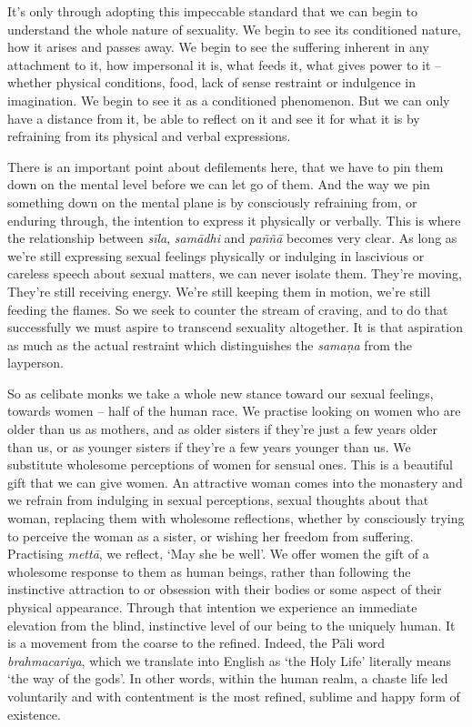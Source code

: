 It's only through adopting this impeccable standard that we can begin to
understand the whole nature of sexuality. We begin to see its
conditioned nature, how it arises and passes away. We begin to see the
suffering inherent in any attachment to it, how impersonal it is, what
feeds it, what gives power to it -- whether physical conditions, food, 
lack of sense restraint or indulgence in imagination. We begin to see it
as a conditioned phenomenon. But we can only have a distance from it, be
able to reflect on it and see it for what it is by refraining from its
physical and verbal expressions. 

There is an important point about defilements here, that we have to pin
them down on the mental level before we can let go of them. And the way
we pin something down on the mental plane is by consciously refraining
from, or enduring through, the intention to express it physically or
verbally. This is where the relationship between \emph{sīla}, 
\emph{samādhi} and \emph{paññā} becomes very clear. As long as we're
still expressing sexual feelings physically or indulging in lascivious
or careless speech about sexual matters, we can never isolate them. 
They're moving, They're still receiving energy. We're still keeping them
in motion, we're still feeding the flames. So we seek to counter the
stream of craving, and to do that successfully we must aspire to
transcend sexuality altogether. It is that aspiration as much as the
actual restraint which distinguishes the \emph{samaṇa} from the
layperson. 

So as celibate monks we take a whole new stance toward our sexual
feelings, towards women -- half of the human race. We practise looking
on women who are older than us as mothers, and as older sisters if
they're just a few years older than us, or as younger sisters if they're
a few years younger than us. We substitute wholesome perceptions of
women for sensual ones. This is a beautiful gift that we can give women. 
An attractive woman comes into the monastery and we refrain from
indulging in sexual perceptions, sexual thoughts about that woman, 
replacing them with wholesome reflections, whether by consciously trying
to perceive the woman as a sister, or wishing her freedom from
suffering. Practising \emph{mettā}, we reflect, `May she be well'. We
offer women the gift of a wholesome response to them as human beings, 
rather than following the instinctive attraction to or obsession with their
bodies or some aspect of their physical appearance. Through that
intention we experience an immediate elevation from the blind, 
instinctive level of our being to the uniquely human. It is a movement
from the coarse to the refined. Indeed, the Pāli word
\emph{brahmacariya}, which we translate into English as `the Holy Life'
literally means `the way of the gods'. In other words, within the human
realm, a chaste life led voluntarily and with contentment is the most
refined, sublime and happy form of existence. 

